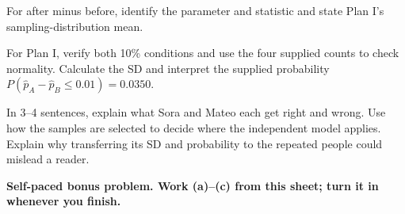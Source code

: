 \documentclass[14pt]{extarticle}
\begin{document}
\begin{description}[leftmargin=1.15in, labelwidth=1in, itemsep=2pt, topsep=2pt]
  \item[\dokbadge{1}~(a)] For after minus before, identify the parameter and statistic and state Plan I's sampling-distribution mean.
  \item[\dokbadge{2}~(b)] For Plan I, verify both 10\% conditions and use the four supplied counts to check normality. Calculate the SD and interpret the supplied probability $P(\widehat p_A-\widehat p_B\leq0.01)=0.0350$.
  \item[\dokbadge{3}~(c)] In 3--4 sentences, explain what Sora and Mateo each get right and wrong. Use how the samples are selected to decide where the independent model applies. Explain why transferring its SD and probability to the repeated people could mislead a reader.
\end{description}

\vfill
\textbf{Self-paced bonus problem. Work (a)--(c) from this sheet; turn it in whenever you finish.}
\end{document}
